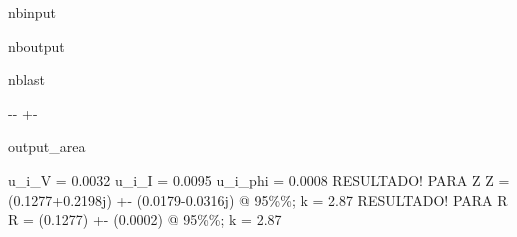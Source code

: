 \documentclass[letterpaper,10pt,english]{sphinxmanual}
\let\sphinxpxdimen\pdfpxdimen\else\newdimen\sphinxpxdimen
\begin{document}
\begin{sphinxuseclass}{nbinput}
{\begin{sphinxVerbatim}[commandchars=\\\{\}]
     

\end{sphinxVerbatim}
}

\end{sphinxuseclass}
\begin{sphinxuseclass}{nboutput}
\begin{sphinxuseclass}{nblast}
{

\kern-\sphinxverbatimsmallskipamount\kern-\baselineskip
\kern+\FrameHeightAdjust\kern-\fboxrule
\vspace{\nbsphinxcodecellspacing}

\begin{sphinxuseclass}{output_area}
\begin{sphinxuseclass}{}


\begin{sphinxVerbatim}[commandchars=\\\{\}]
u\_i\_V = 0.0032
u\_i\_I = 0.0095
u\_i\_phi = 0.0008
RESULTADO! PARA Z
Z = (0.1277+0.2198j) +- (0.0179-0.0316j) @ 95\%\%; k = 2.87
RESULTADO! PARA R
R = (0.1277) +- (0.0002) @ 95\%\%; k = 2.87
\end{sphinxVerbatim}



\end{sphinxuseclass}
\end{sphinxuseclass}
}

\end{sphinxuseclass}
\end{sphinxuseclass}
\sphinxAtStartPar
\sphinxincludegraphics[width=746\sphinxpxdimen,height=530\sphinxpxdimen]{{image4}.png}
\end{document}
